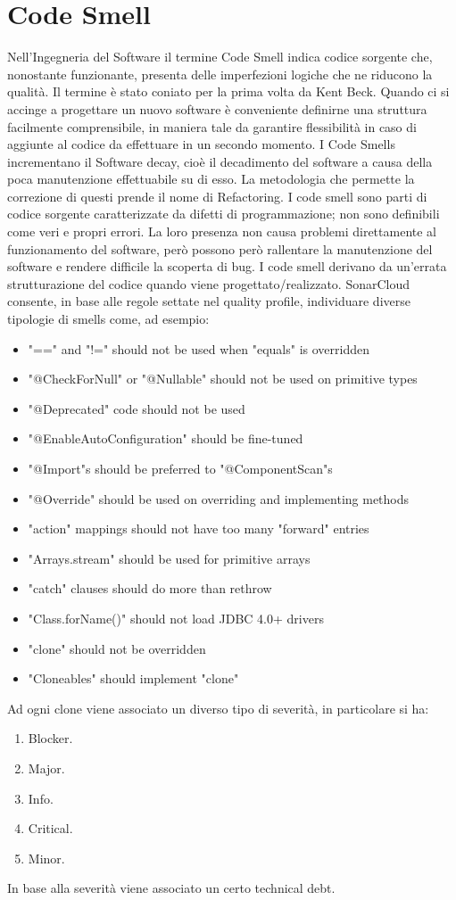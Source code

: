 \section{Code Smell}
Nell’Ingegneria del Software il termine Code Smell indica codice sorgente che, nonostante funzionante, presenta delle imperfezioni logiche che ne riducono la qualità. Il termine è stato coniato per la prima volta da Kent Beck. Quando ci si accinge a progettare un nuovo software è conveniente definirne una struttura facilmente comprensibile, in maniera tale da garantire  flessibilità in caso di aggiunte al codice da effettuare in un secondo momento. I Code Smells incrementano il Software decay, cioè il decadimento del software a causa della poca manutenzione effettuabile su di esso. La metodologia che permette la correzione di questi prende il nome di Refactoring. I code smell sono parti di codice sorgente caratterizzate da difetti di programmazione; non sono definibili come veri e propri errori. La loro presenza non causa problemi direttamente al funzionamento del software, però possono però rallentare la manutenzione del software e rendere difficile la  scoperta di bug. I code smell derivano da un’errata strutturazione del codice quando viene progettato/realizzato. SonarCloud consente, in base alle regole settate nel quality profile, individuare diverse tipologie di smells come, ad esempio:
\begin{itemize}
\item "==" and "!=" should not be used when "equals" is overridden
\item "@CheckForNull" or "@Nullable" should not be used on primitive types
\item "@Deprecated" code should not be used
\item "@EnableAutoConfiguration" should be fine-tuned
\item "@Import"s should be preferred to "@ComponentScan"s
\item "@Override" should be used on overriding and implementing methods
\item "action" mappings should not have too many "forward" entries
\item "Arrays.stream" should be used for primitive arrays
\item "catch" clauses should do more than rethrow
\item "Class.forName()" should not load JDBC 4.0+ drivers
\item "clone" should not be overridden
\item "Cloneables" should implement "clone"
\end{itemize}
Ad ogni clone viene associato un diverso tipo di severità, in particolare si ha:
\begin{enumerate}
\item Blocker.
\item Major.
\item Info.
\item Critical.
\item Minor.
\end{enumerate}
In base alla severità viene associato un certo technical debt.